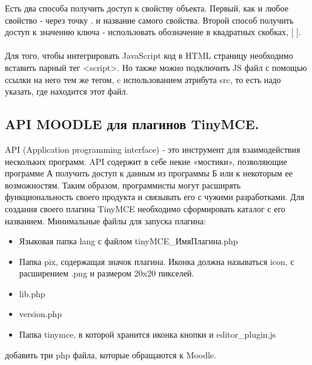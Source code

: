 \documentclass[14pt,Diplom]{diplomwork}
\begin{document}
Есть два способа получить доступ к свойству объекта. Первый, как и любое свойство - через точку . и название самого свойства. Второй способ получить доступ к значению ключа - использовать обозначение в квадратных скобках, [ ].


\paragraph{}
Для того, чтобы интегрировать JavaScript код в HTML страницу необходимо вставить парный тег <script>. Но также можно подключить JS файл с помощью ссылки на него тем же тегом, c использованием атрибута src, то есть надо указать, где находится этот файл.


\subsection{API MOODLE для плагинов TinyMCE.}
API (Application programming interface) - это инструмент для взаимодействия нескольких программ. API содержит в себе некие «мостики», позволяющие программе А получить доступ к данным из программы Б или к некоторым ее возможностям. Таким образом, программисты могут расширять функциональность своего продукта и связывать его с чужими разработками. Для создания своего плагина TinyMCE необходимо сформировать каталог с его названием. Минимальные файлы для запуска плагина: 
\begin{itemize}
	\item Языковая папка lang с файлом tinyMCE\_ИмяПлагина.php
	\item Папка pix, содержащая значок плагина. Иконка должна называться icon, с расширением .png и размером 20x20 пикселей.
	\item lib.php
	\item version.php
	\item Папка tinymce, в которой хранится иконка кнопки и editor\_plugin.js
\end{itemize}
добавить три php файла, которые обращаются к Moodle.
\end{document}
